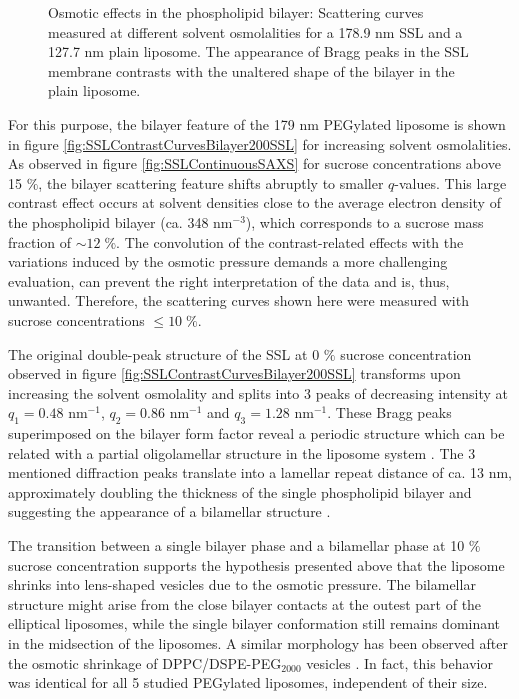 \begin{figure}
	\centering
		\subfloat[PEG 179 nm]{\resizebox{0.44\linewidth}{!}{}\label{fig:SSLContrastCurvesBilayer200SSL}}
		\subfloat[Plain 128 nm]{\resizebox{0.44\linewidth}{!}{}\label{fig:SSLContrastCurvesBilayer100Plain}}
		\caption[Osmotic effects in the phospholipid bilayer.]{Osmotic effects in the phospholipid bilayer: Scattering curves measured at different solvent osmolalities for a 178.9 nm SSL and a 127.7 nm plain liposome. The appearance of Bragg peaks in the SSL membrane contrasts with the unaltered shape of the bilayer in the plain liposome.}
\end{figure}

For this purpose, the bilayer feature of the 179 nm PEGylated liposome is shown in figure \ref{fig:SSLContrastCurvesBilayer200SSL} for increasing solvent osmolalities. As observed in figure \ref{fig:SSLContinuousSAXS} for sucrose concentrations above 15 $\%$, the bilayer scattering feature shifts abruptly to smaller $q$-values. This large contrast effect occurs at solvent densities close to the average electron density of the phospholipid bilayer (ca. 348 nm$^{-3}$), which corresponds to a sucrose mass fraction of $\sim 12 \; \%$. The convolution of the contrast-related effects with the variations induced by the osmotic pressure demands a more challenging evaluation, can prevent the right interpretation of the data and is, thus, unwanted. Therefore, the scattering curves shown here were measured with sucrose concentrations $\leq10\;\%$.

The original double-peak structure of the SSL at 0 $\%$ sucrose concentration observed in figure \ref{fig:SSLContrastCurvesBilayer200SSL} transforms upon increasing the solvent osmolality and splits into 3 peaks of decreasing intensity at $q_1=0.48$ nm$^{-1}$, $q_2=0.86$ nm$^{-1}$ and $q_3=1.28$ nm$^{-1}$. These Bragg peaks superimposed on the bilayer form factor reveal a periodic structure which can be related with a partial oligolamellar structure in the liposome system \citep{fernandez_influence_2008}. The 3 mentioned diffraction peaks translate into a lamellar repeat distance of ca. 13 nm, approximately doubling the thickness of the single phospholipid bilayer \citep{kenworthy_range_1995} and suggesting the appearance of a bilamellar structure \citep{deme_giant_2002}. 

The transition between a single bilayer phase and a bilamellar phase at 10 $\%$ sucrose concentration supports the hypothesis presented above that the liposome shrinks into lens-shaped vesicles due to the osmotic pressure. The bilamellar structure might arise from the close bilayer contacts at the outest part of the elliptical liposomes, while the single bilayer conformation still remains dominant in the midsection of the liposomes. A similar morphology has been observed after the osmotic shrinkage of DPPC/DSPE-PEG$_{2000}$ vesicles \citep{terreno_osmotically_2009}. In fact, this behavior was identical for all 5 studied PEGylated liposomes, independent of their size. 

